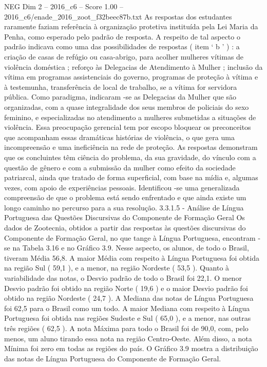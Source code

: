 \begin{textsample}{NEG Dim 2 – 2016\_c6 – Score 1.00 – 2016\_c6/enade\_2016\_zoot\_f32beec87b.txt}
As respostas dos estudantes raramente faziam referência à organização protetiva instituída pela Lei Maria da Penha, como esperado pelo padrão de resposta.
A respeito de tal aspecto o padrão indicava como uma das possibilidades de respostas ( item ‘ b ’ ) : a criação de casas de refúgio ou casa-abrigo, para acolher mulheres vítimas de violência doméstica ; reforço às Delegacias de Atendimento à Mulher ; inclusão da vítima em programas assistenciais do governo, programas de proteção à vítima e à testemunha, transferência de local de trabalho, se a vítima for servidora pública.
Como paradigma, indicaram -se as Delegacias da Mulher que são organizadas, com a quase integralidade dos seus membros de policiais do sexo feminino, e especializadas no atendimento a mulheres submetidas a situações de violência.
Essa preocupação gerencial tem por escopo bloquear os preconceitos que acompanham essas dramáticas histórias de violência, o que gera uma incompreensão e uma ineficiência na rede de proteção.
As respostas demonstram que os concluintes têm ciência do problema, da sua gravidade, do vínculo com a questão de gênero e com a submissão da mulher como efeito da sociedade patriarcal, ainda que tratado de forma superficial, com base na mídia e, algumas vezes, com apoio de experiências pessoais.
Identificou -se uma generalizada compreensão de que o problema está sendo enfrentado e que ainda existe um longo caminho no percurso para a sua resolução. 3.3.1.5 - Análise de Língua Portuguesa das Questões Discursivas do Componente de Formação Geral Os dados de Zootecnia, obtidos a partir das respostas às questões discursivas do Componente de Formação Geral, no que tange à Língua Portuguesa, encontram -se na Tabela 3.16 e no Gráfico 3.9.
Nesse aspecto, os alunos, de todo o Brasil, tiveram Média 56,8.
A maior Média com respeito à Língua Portuguesa foi obtida na região Sul ( 59,1 ), e a menor, na região Nordeste ( 53,5 ).
Quanto à variabilidade das notas, o Desvio padrão de todo o Brasil foi 22,1.
O menor Desvio padrão foi obtido na região Norte ( 19,6 ) e o maior Desvio padrão foi obtido na região Nordeste ( 24,7 ).
A Mediana das notas de Língua Portuguesa foi 62,5 para o Brasil como um todo.
A maior Mediana com respeito à Língua Portuguesa foi obtida nas regiões Sudeste e Sul ( 65,0 ), e a menor, nas outras três regiões ( 62,5 ).
A nota Máxima para todo o Brasil foi de 90,0, com, pelo menos, um aluno tirando essa nota na região Centro-Oeste.
Além disso, a nota Mínima foi zero em todas as regiões do país.
O Gráfico 3.9 mostra a distribuição das notas de Língua Portuguesa do Componente de Formação Geral.

\end{textsample}
